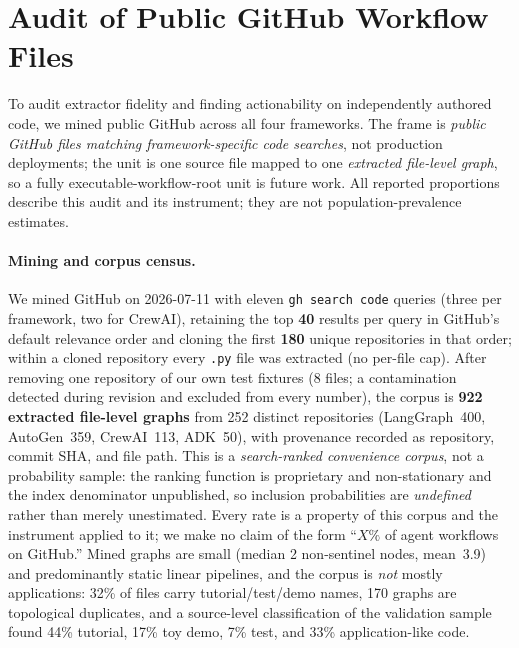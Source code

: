 \section{Audit of Public GitHub Workflow Files}
\label{sec:realworld}

To audit extractor fidelity and finding actionability on independently authored
code, we mined public GitHub across all four frameworks. The frame is
\emph{public GitHub files matching
framework-specific code searches}, not production deployments; the unit is one
source file mapped to one \emph{extracted file-level graph}, so a fully
executable-workflow-root unit is future work. All reported proportions describe
this audit and its instrument; they are not population-prevalence estimates.

\paragraph{Mining and corpus census.}
We mined GitHub on 2026-07-11 with eleven \texttt{gh search code} queries
(three per framework, two for CrewAI), retaining the top \textbf{40} results per
query in GitHub's default relevance order and cloning the first \textbf{180}
unique repositories in that order; within a cloned repository every
\texttt{.py} file was extracted (no per-file cap). After removing one repository
of our own test fixtures (8 files; a contamination detected during revision and
excluded from every number), the corpus is \textbf{922 extracted file-level
graphs} from 252 distinct repositories (LangGraph~400, AutoGen~359, CrewAI~113,
ADK~50), with provenance recorded as repository, commit SHA, and file path.
This is a \emph{search-ranked convenience corpus}, not a probability sample: the
ranking function is proprietary and non-stationary and the index denominator
unpublished, so inclusion probabilities are \emph{undefined} rather than merely
unestimated. Every rate is a property of this corpus and the instrument applied
to it; we make no claim of the form ``$X\%$ of agent workflows on GitHub.'' Mined graphs are small (median 2
non-sentinel nodes, mean~3.9) and predominantly static linear pipelines, and the
corpus is \emph{not} mostly applications: 32\% of files carry tutorial/test/demo
names, 170 graphs are topological duplicates, and a source-level classification
of the validation sample found 44\% tutorial, 17\% toy demo, 7\% test, and 33\%
application-like code.

